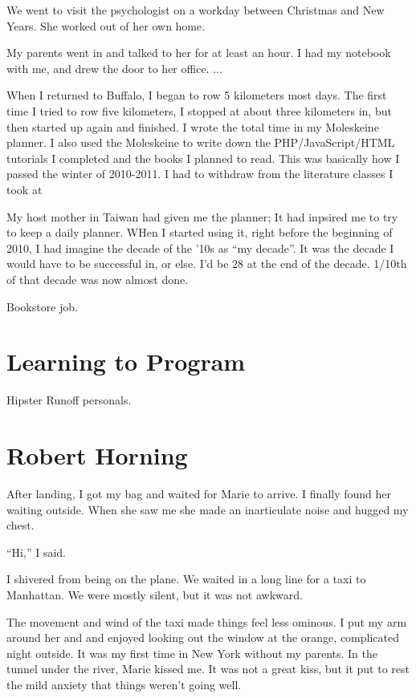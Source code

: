 \documentclass[12pt]{memoir}
\begin{document}
We went to visit the psychologist on a workday between Christmas and New
Years.  She worked out of her own home. 

My parents went in and talked to her for at least an hour.  I had my notebook
with me, and drew the door to her office.   ...

When I returned to Buffalo, I began to row 5 kilometers most days.  The first
time I tried to row five kilometers, I stopped at about three kilometers in, but
then started up again and finished.  I wrote the total time in my Moleskeine
planner.  I also used the Moleskeine to write down the PHP/JavaScript/HTML
tutorials I completed and the books I planned to read.  This was basically how I
passed the winter of 2010-2011.  I had to withdraw from the literature classes I
took at 

My host mother in Taiwan had given me the planner;     It had inpsired me to try
to keep a daily planner.  WHen I started using it, right before the beginning of
2010, I had imagine the decade of the '10s as ``my decade''.  It was the decade
I would have to be successful in, or else.  I'd be 28 at the end of the decade.
1/10th of that decade was now almost done.

Bookstore job.  

\chapter{Learning to Program}
Hipster Runoff personals.

\chapter{Robert Horning}

After landing, I got my bag and waited for Marie to arrive.  I finally found her
waiting outside.  When she saw me she made an inarticulate noise and hugged my
chest.

``Hi,'' I said.

I shivered from being on the plane.  We waited in a long line for a taxi to
Manhattan.  We were mostly silent, but it was not awkward. 

The movement and wind of the taxi made things feel less ominous.  I put my arm
around her and and enjoyed looking out the window at the orange, complicated
night outside.  It was my first time in New York without my parents.  In the
tunnel under the river, Marie kissed me.  It was not a great kiss, but it put
to rest the mild anxiety that things weren't going well.
\end{document}
